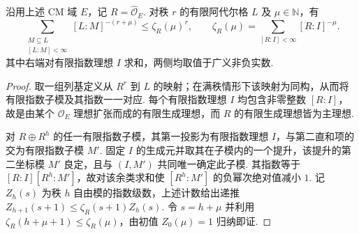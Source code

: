 \begin{lemma}
\label{lem:b-sublattice-index-zeta}
\emitthmsource
沿用上述 CM 域 $E$，记 $R=\widehat{\mathcal O}_E$. 对秩 $r$ 的有限阿代尔格 $L$ 及 $\mu\in\mathbb N$，有
\[
 \sum_{\substack{M\subseteq L\\ \left[L:M\right]<\infty}} [L:M]^{-(r+\mu)}
       \le \zeta_R(\mu)^r,\qquad
 \zeta_R(\mu)=\sum_{[R:I]<\infty}[R:I]^{-\mu}.
\]
其中右端对有限指数理想 $I$ 求和，两侧均取值于广义非负实数.
\end{lemma}
\begin{proof}
取一组列基定义从 $R^r$ 到 $L$ 的映射；在满秩情形下该映射为同构，从而将有限指数子模及其指数一一对应.
每个有限指数理想 $I$ 均包含非零整数 $[R:I]$，故是由某个 $\mathcal O_E$ 理想扩张而成的有限生成理想，而 $R$ 的有限生成理想皆为主理想.

对 $R\oplus R^h$ 的任一有限指数子模，其第一投影为有限指数理想 $I$，与第二直和项的交为有限指数子模 $M'$. 固定 $I$ 的生成元并取其在子模内的一个提升，该提升的第二坐标模 $M'$ 良定，且与 $(I,M')$ 共同唯一确定此子模. 其指数等于 $[R:I][R^h:M']$，故对该余类求和使 $[R^h:M']$ 的负幂次绝对值减小 $1$. 记 $Z_h(s)$ 为秩 $h$ 自由模的指数级数，上述计数给出递推 $Z_{h+1}(s+1)\le \zeta_R(s+1) Z_h(s)$. 令 $s=h+\mu$ 并利用 $\zeta_R(h+\mu+1)\le\zeta_R(\mu)$，由初值 $Z_0(\mu)=1$ 归纳即证.
\end{proof}

